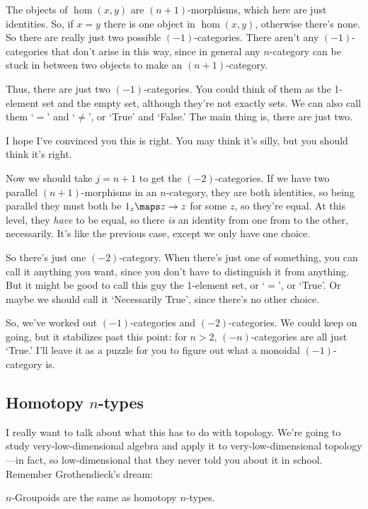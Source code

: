 \documentclass[12pt]{amsart}
\begin{document}
The objects of $\hom(x,y)$ are $(n+1)$-morphisms, which here are just
identities.  So, if $x=y$ there is one object in $\hom(x,y)$,
otherwise there's none.  So there are really just two possible
$(-1)$-categories.  There aren't any $(-1)$-categories that don't
arise in this way, since in general any $n$-category can be stuck 
in between two objects to make an $(n+1)$-category.

Thus, there are just two $(-1)$-categories.  You could think of them as
the 1-element set and the empty set, although they're not exactly
sets.  We can also call them `$=$' and `$\neq$', or `True' and
`False.'  The main thing is, there are just two.

I hope I've convinced you this is right.  You may think it's silly,
but you should think it's right.

Now we should take $j= n+1$ to get the $(-2)$-categories.  If we have
two parallel $(n+1)$-morphisms in an $n$-category, they are both
identities, so being parallel they must both be 
$1_z \maps z\to z$ for some $z$, so they're equal.
At this level, they \emph{have} to be equal, so there \emph{is} an
identity from one from to the other, necessarily.  It's
like the previous case, except we only have one choice.

So there's just one $(-2)$-category.  When there's just one of
something, you can call it anything you want, since you don't have to
distinguish it from anything.  But it might be good to call 
this guy the 1-element set, or `$=$', or `True'.  Or maybe we should
call it `Necessarily True', since there's no other choice.

So, we've worked out $(-1)$-categories and $(-2)$-categories.  
We could keep on going, but it stabilizes past this point:
for $n>2$, $(-n)$-categories are all just `True.'
I'll leave it as a puzzle for you to figure out what a monoidal
$(-1)$-category is.

\subsection{Homotopy $n$-types}
\label{sec:homotopy-n-types}

I really want to talk about what this has to do with topology.  We're
going to study very-low-dimensional algebra and apply it to
very-low-dimensional topology---in fact, so low-dimensional that they
never told you about it in school.  Remember Grothendieck's dream:

\begin{hyp}
$n$-Groupoids are the same as homotopy $n$-types.
\end{hyp}
\end{document}
